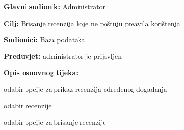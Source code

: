 \begin{packed_item}
\begin{packed_item}
					\end{packed_item}
					
					
					
					\noindent {}
					\begin{packed_item}
	
						\item \textbf{Glavni sudionik: }Administrator
						\item  \textbf{Cilj:} Brisanje recenzija koje ne poštuju preavila korištenja
						\item  \textbf{Sudionici:} Baza podataka
						\item  \textbf{Preduvjet:} administrator je prijavljen
						\item  \textbf{Opis osnovnog tijeka:}
						
						\item[] \begin{packed_enum}
	
							\item odabir opcije za prikaz recenzija određenog događanja
							\item odabir recenzije
							\item odabir opcije za brisanje recenzije
						\end{packed_enum}
						
						\end{packed_item}
					\end{packed_item}
					
